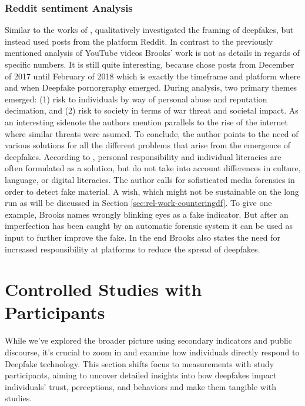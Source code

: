 \documentclass[
  a4paper,  %
  twoside,  %
  bibliography=totoc,
  headsepline,
  cleardoublepage=empty,
  parskip=half,
  draft=false
]{scrbook}
\begin{document}
\subsubsection*{Reddit sentiment Analysis}
Similar to the works of \citeauthor{leeBelieveNotBelieve2021}, \citeauthor{brooksPopularDiscourseDeepfakes2021} qualitatively investigated the framing of deepfakes, but instead used posts from the platform Reddit. In contrast to the previously mentioned analysis of YouTube videos Brooks' work is not as details in regards of specific numbers. It is still quite interesting, because \citeauthor{brooksPopularDiscourseDeepfakes2021} chose posts from December of 2017 until February of 2018 which is exactly the timeframe and platform where and when Deepfake pornorgraphy emerged. During analysis, two primary themes emerged: (1) risk to individuals by way of personal abuse and reputation decimation, and (2) risk to society in terms of war threat and societal impact. As an interesting sidenote the authors mention parallels to the rise of the internet where similar threats were asumed. To conclude, the author points to the need of various solutions for all the different problems that arise from the emergence of deepfakes. According to \cite{brooksPopularDiscourseDeepfakes2021}, personal responsibility and individual literacies are often formulated as a solution, but do not take into account differences in culture, language, or digital literacies. The author calls for sofisticated media forensics in order to detect fake material. A wish, which might not be sustainable on the long run as will be discussed in Section \ref{sec:rel-work-counteringdf}. To give one example, Brooks names wrongly blinking eyes as a fake indicator. But after an imperfection has been caught by an automatic forensic system it can be used as input to further improve the fake. In the end Brooks also states the need for increased responsibility at platforms to reduce the spread of deepfakes.

\section{Controlled Studies with Participants}
\label{sec:rel-studypart}

While we've explored the broader picture using secondary indicators and public discourse, it's crucial to zoom in and examine how individuals directly respond to Deepfake technology. This section shifts focus to measurements with study participants, aiming to uncover detailed insights into how deepfakes impact individuals' trust, perceptions, and behaviors and make them tangible with studies.
\end{document}
